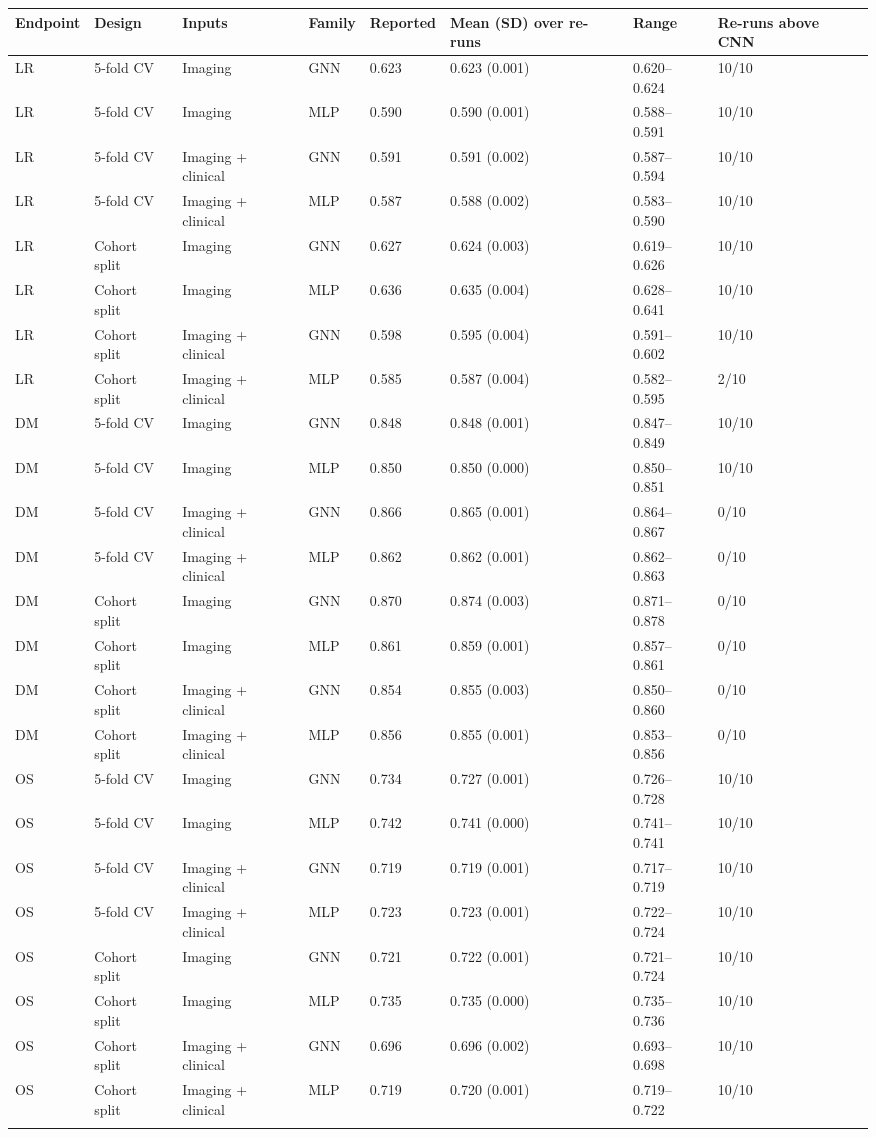 \begin{tabular}{@{}llllllll@{}}
\toprule
Endpoint & Design & Inputs & Family & Reported & Mean (SD) over re-runs & Range & Re-runs above CNN \\
\midrule
LR & 5-fold CV & Imaging & GNN & 0.623 & 0.623 (0.001) & 0.620--0.624 & 10/10 \\
LR & 5-fold CV & Imaging & MLP & 0.590 & 0.590 (0.001) & 0.588--0.591 & 10/10 \\
LR & 5-fold CV & Imaging + clinical & GNN & 0.591 & 0.591 (0.002) & 0.587--0.594 & 10/10 \\
LR & 5-fold CV & Imaging + clinical & MLP & 0.587 & 0.588 (0.002) & 0.583--0.590 & 10/10 \\
LR & Cohort split & Imaging & GNN & 0.627 & 0.624 (0.003) & 0.619--0.626 & 10/10 \\
LR & Cohort split & Imaging & MLP & 0.636 & 0.635 (0.004) & 0.628--0.641 & 10/10 \\
LR & Cohort split & Imaging + clinical & GNN & 0.598 & 0.595 (0.004) & 0.591--0.602 & 10/10 \\
LR & Cohort split & Imaging + clinical & MLP & 0.585 & 0.587 (0.004) & 0.582--0.595 & 2/10 \\
\midrule
DM & 5-fold CV & Imaging & GNN & 0.848 & 0.848 (0.001) & 0.847--0.849 & 10/10 \\
DM & 5-fold CV & Imaging & MLP & 0.850 & 0.850 (0.000) & 0.850--0.851 & 10/10 \\
DM & 5-fold CV & Imaging + clinical & GNN & 0.866 & 0.865 (0.001) & 0.864--0.867 & 0/10 \\
DM & 5-fold CV & Imaging + clinical & MLP & 0.862 & 0.862 (0.001) & 0.862--0.863 & 0/10 \\
DM & Cohort split & Imaging & GNN & 0.870 & 0.874 (0.003) & 0.871--0.878 & 0/10 \\
DM & Cohort split & Imaging & MLP & 0.861 & 0.859 (0.001) & 0.857--0.861 & 0/10 \\
DM & Cohort split & Imaging + clinical & GNN & 0.854 & 0.855 (0.003) & 0.850--0.860 & 0/10 \\
DM & Cohort split & Imaging + clinical & MLP & 0.856 & 0.855 (0.001) & 0.853--0.856 & 0/10 \\
\midrule
OS & 5-fold CV & Imaging & GNN & 0.734 & 0.727 (0.001) & 0.726--0.728 & 10/10 \\
OS & 5-fold CV & Imaging & MLP & 0.742 & 0.741 (0.000) & 0.741--0.741 & 10/10 \\
OS & 5-fold CV & Imaging + clinical & GNN & 0.719 & 0.719 (0.001) & 0.717--0.719 & 10/10 \\
OS & 5-fold CV & Imaging + clinical & MLP & 0.723 & 0.723 (0.001) & 0.722--0.724 & 10/10 \\
OS & Cohort split & Imaging & GNN & 0.721 & 0.722 (0.001) & 0.721--0.724 & 10/10 \\
OS & Cohort split & Imaging & MLP & 0.735 & 0.735 (0.000) & 0.735--0.736 & 10/10 \\
OS & Cohort split & Imaging + clinical & GNN & 0.696 & 0.696 (0.002) & 0.693--0.698 & 10/10 \\
OS & Cohort split & Imaging + clinical & MLP & 0.719 & 0.720 (0.001) & 0.719--0.722 & 10/10 \\
\botrule
\end{tabular}
